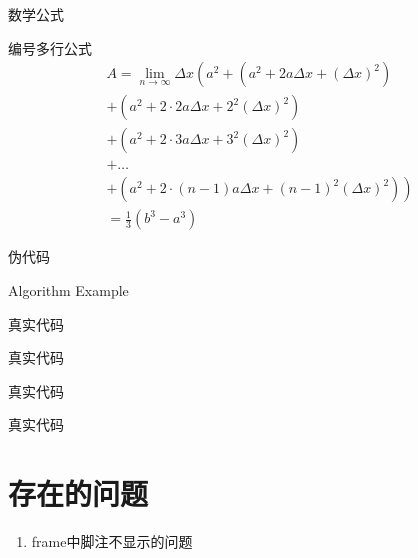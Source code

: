 \documentclass{libs/format}
\begin{document}
\begin{frame}{数学公式}
  \begin{exampleblock}{编号多行公式}
      \begin{multline}
          A=\lim_{n\rightarrow\infty}\Delta x\left(a^{2}+\left(a^{2}+2a\Delta x+\left(\Delta x\right)^{2}\right)\right.\label{eq:reset}\\
          +\left(a^{2}+2\cdot2a\Delta x+2^{2}\left(\Delta x\right)^{2}\right)\\
          +\left(a^{2}+2\cdot3a\Delta x+3^{2}\left(\Delta x\right)^{2}\right)\\
          +\ldots\\
          \left.+\left(a^{2}+2\cdot(n-1)a\Delta x+(n-1)^{2}\left(\Delta x\right)^{2}\right)\right)\\
          =\frac{1}{3}\left(b^{3}-a^{3}\right)
      \end{multline}
  \end{exampleblock}
\end{frame}

\begin{frame}{伪代码}
  \begin{algorithm}[H]
      \SetAlgoLined
      \LinesNumbered
       \caption{Algorithm Example}
  \end{algorithm}
\end{frame}

\begin{frame}{真实代码}
  \lstset{language=Python}
  
\end{frame}

\begin{frame}{真实代码}
  
\end{frame}

\begin{frame}{真实代码}
  
\end{frame}

\begin{frame}{真实代码}
  
\end{frame}

\section{存在的问题}

\begin{frame}

\begin{enumerate}
  \item frame中脚注不显示的问题
\end{enumerate}
  
\end{frame}

\begin{frame}[allowframebreaks]
    \printbibliography[title = {参考文献}]
\end{frame}
\end{document}
